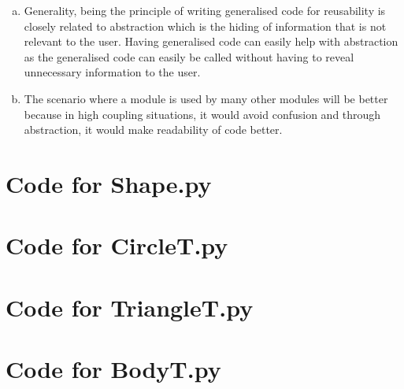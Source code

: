 \documentclass[12pt]{article}
\begin{document}
\begin{enumerate}[a)]
\item Generality, being the principle of writing generalised code for reusability is closely related to abstraction which is the hiding of information that is not relevant to the user. Having generalised code can easily help with abstraction as the generalised code can easily be called without having to reveal unnecessary information to the user.

\item The scenario where a module is used by many other modules will be better because in high coupling situations, it would avoid confusion and through abstraction, it would make readability of code better.

\end{enumerate}

\newpage

\lstset{language=Python, basicstyle=\tiny, breaklines=true, showspaces=false,
  showstringspaces=false, breakatwhitespace=true}

\def\thesection{\Alph{section}}

\section{Code for Shape.py}

\noindent 

\newpage

\section{Code for CircleT.py}

\noindent 

\newpage

\section{Code for TriangleT.py}

\noindent 

\newpage

\section{Code for BodyT.py}

\noindent 

\newpage
\end{document}
